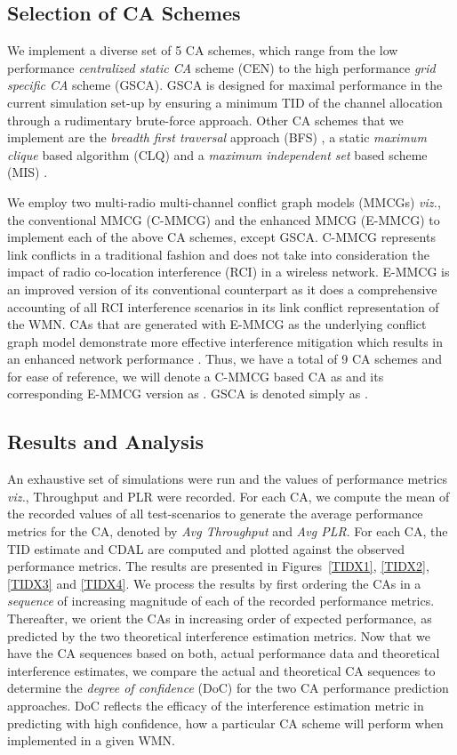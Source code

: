 \documentclass[conference]{IEEEtran}
\begin{document}
\subsection{Selection of CA Schemes} 
We implement a diverse set of 5 CA schemes, which range from the low performance \textit{centralized static CA} scheme (CEN) \cite{23Cheng} to the high performance \textit{grid specific CA} scheme (GSCA). GSCA is designed for maximal performance in the current simulation set-up by ensuring a minimum TID of the channel allocation through a rudimentary brute-force approach. Other CA schemes that we implement are the \textit{breadth first traversal} approach (BFS) \cite{22Ramachandran}, a static \textit{maximum clique} based algorithm (CLQ) \cite{17Xutao} and a \textit{maximum independent set} based scheme (MIS) \cite{24Aizaz}. 

We employ two multi-radio multi-channel conflict graph models (MMCGs) \emph{viz.}, the conventional MMCG (C-MMCG) and the enhanced MMCG (E-MMCG) \cite{Manas} to implement each of the above CA schemes, except GSCA. C-MMCG represents link conflicts in a traditional fashion and does not take into consideration the impact of radio co-location interference (RCI) in a wireless network. E-MMCG is an improved version of its conventional counterpart as it does a comprehensive accounting of all RCI interference scenarios in its link conflict representation of the WMN. CAs that are generated with E-MMCG as the underlying conflict graph model demonstrate more effective interference mitigation which results in an enhanced network performance \cite{Manas}. Thus, we have a total of 9 CA schemes and for ease of reference, we will denote a C-MMCG based CA as  and its corresponding E-MMCG version as . GSCA is denoted simply as .

\subsection{Results and Analysis}
An exhaustive set of simulations were run and the values of performance metrics \emph{viz.}, Throughput and PLR were recorded. For each CA, we compute the mean of the recorded values of all test-scenarios to generate the average performance metrics for the CA, denoted by \textit{Avg Throughput} and \textit{Avg PLR}. For each CA, the TID estimate and CDAL are computed and plotted against the observed performance metrics. The results are presented in Figures~\ref{TIDX1}, \ref{TIDX2}, \ref{TIDX3} and \ref{TIDX4}.
We process the results by first ordering the CAs in a \textit{sequence} of increasing magnitude of each of the recorded performance metrics. Thereafter, we orient the CAs in increasing order of expected performance, as predicted by the two theoretical interference estimation metrics. Now that we have the CA sequences based on both, actual performance data and theoretical interference estimates, we compare the actual and theoretical CA sequences to determine the \textit{degree of confidence} (DoC) for the two CA performance prediction approaches. DoC reflects the efficacy of the interference estimation metric in predicting with high confidence, how a particular CA scheme will perform when implemented in a given WMN.
\end{document}
